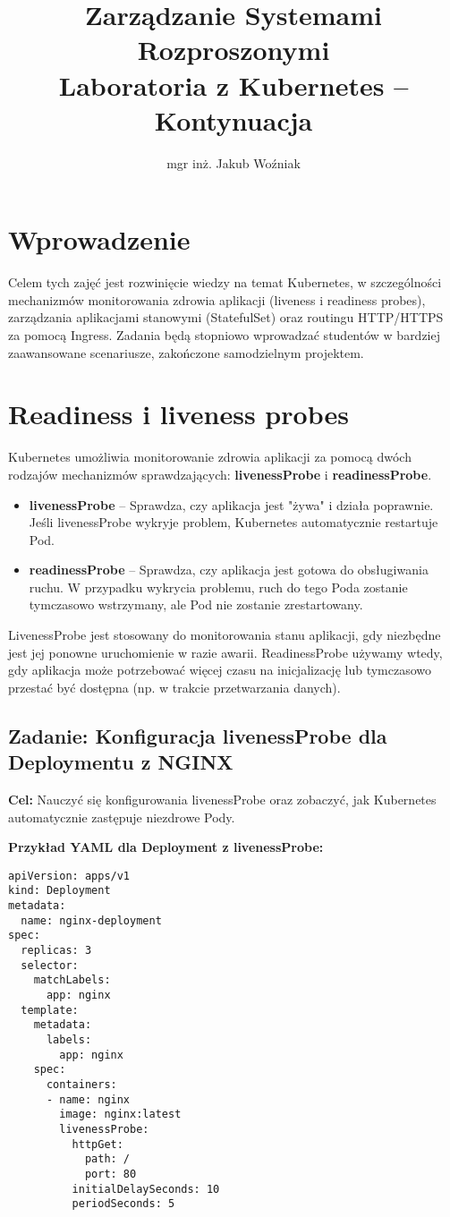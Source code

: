 \documentclass{article}
\date{}
\title{Zarządzanie Systemami Rozproszonymi\\Laboratoria z Kubernetes – Kontynuacja}
\author{mgr inż. Jakub Woźniak}
\begin{document}
\maketitle

\section{Wprowadzenie}
Celem tych zajęć jest rozwinięcie wiedzy na temat Kubernetes, w szczególności mechanizmów monitorowania zdrowia aplikacji (liveness i readiness probes), zarządzania aplikacjami stanowymi (StatefulSet) oraz routingu HTTP/HTTPS za pomocą Ingress. Zadania będą stopniowo wprowadzać studentów w bardziej zaawansowane scenariusze, zakończone samodzielnym projektem.

\section{Readiness i liveness probes}
Kubernetes umożliwia monitorowanie zdrowia aplikacji za pomocą dwóch rodzajów mechanizmów sprawdzających: \textbf{livenessProbe} i \textbf{readinessProbe}.
\begin{itemize}
    \item \textbf{livenessProbe} – Sprawdza, czy aplikacja jest "żywa" i działa poprawnie. Jeśli livenessProbe wykryje problem, Kubernetes automatycznie restartuje Pod.
    \item \textbf{readinessProbe} – Sprawdza, czy aplikacja jest gotowa do obsługiwania ruchu. W przypadku wykrycia problemu, ruch do tego Poda zostanie tymczasowo wstrzymany, ale Pod nie zostanie zrestartowany.
\end{itemize}
LivenessProbe jest stosowany do monitorowania stanu aplikacji, gdy niezbędne jest jej ponowne uruchomienie w razie awarii. ReadinessProbe używamy wtedy, gdy aplikacja może potrzebować więcej czasu na inicjalizację lub tymczasowo przestać być dostępna (np. w trakcie przetwarzania danych).

\subsection{Zadanie: Konfiguracja livenessProbe dla Deploymentu z NGINX}
\textbf{Cel:} Nauczyć się konfigurowania livenessProbe oraz zobaczyć, jak Kubernetes automatycznie zastępuje niezdrowe Pody.

\textbf{Przykład YAML dla Deployment z livenessProbe:}
\begin{lstlisting}
apiVersion: apps/v1
kind: Deployment
metadata:
  name: nginx-deployment
spec:
  replicas: 3
  selector:
    matchLabels:
      app: nginx
  template:
    metadata:
      labels:
        app: nginx
    spec:
      containers:
      - name: nginx
        image: nginx:latest
        livenessProbe:
          httpGet:
            path: /
            port: 80
          initialDelaySeconds: 10
          periodSeconds: 5
\end{lstlisting}
\end{document}
